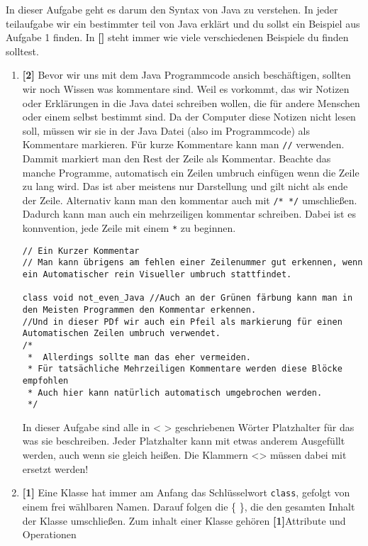 
In dieser Aufgabe geht es darum den Syntax von Java zu verstehen.
In jeder teilaufgabe wir ein bestimmter teil von Java erklärt und du sollst ein Beispiel aus Aufgabe 1 finden. In \textbf{[]} steht immer wie viele verschiedenen Beispiele du finden solltest.

\begin{enumerate}
    \item \textbf{[2]} Bevor wir uns mit dem Java Programmcode ansich beschäftigen, sollten wir noch Wissen was kommentare sind.
    Weil es vorkommt, das wir Notizen oder Erklärungen in die Java datei schreiben wollen, die für andere Menschen oder einem selbst bestimmt sind. Da der Computer diese Notizen nicht lesen soll, müssen wir sie in der Java Datei (also im Programmcode) als Kommentare markieren.
          Für kurze Kommentare kann man \lstinline[breaklines=false]{//} verwenden. Dammit markiert man den Rest der Zeile als Kommentar. Beachte das manche Programme, automatisch ein Zeilen umbruch einfügen wenn die Zeile zu lang wird.
          Das ist aber meistens nur Darstellung und gilt nicht als ende der Zeile.
          Alternativ kann man den kommentar auch mit \lstinline[breaklines=false]{/* */} umschließen. Dadurch kann man auch ein mehrzeiligen kommentar schreiben. Dabei ist es konnvention, jede Zeile mit einem \textcolor{javagreen}{\texttt{*}} zu beginnen.
          \begin{lstlisting}[title=\textbf{Kommentar Beispiel}]
// Ein Kurzer Kommentar 
// Man kann übrigens am fehlen einer Zeilenummer gut erkennen, wenn ein Automatischer rein Visueller umbruch stattfindet.
    
class void not_even_Java //Auch an der Grünen färbung kann man in den Meisten Programmen den Kommentar erkennen.
//Und in dieser PDf wir auch ein Pfeil als markierung für einen Automatischen Zeilen umbruch verwendet.
/*
 *  Allerdings sollte man das eher vermeiden.
 * Für tatsächliche Mehrzeiligen Kommentare werden diese Blöcke empfohlen
 * Auch hier kann natürlich automatisch umgebrochen werden.
 */
        \end{lstlisting}
        In dieser Aufgabe sind alle in < > geschriebenen Wörter Platzhalter für das was sie beschreiben. Jeder Platzhalter kann mit etwas anderem Ausgefüllt werden, auch wenn sie gleich heißen. Die Klammern <> müssen dabei mit ersetzt werden!
    \item \textbf{[1]} Eine Klasse hat immer am Anfang das Schlüsselwort \lstinline{class}, gefolgt von einem frei wählbaren Namen. Darauf folgen die \{ \}, die den gesamten Inhalt der Klasse umschließen.
          Zum inhalt einer Klasse gehören \textbf{[1]}Attribute und Operationen


\end{enumerate}
